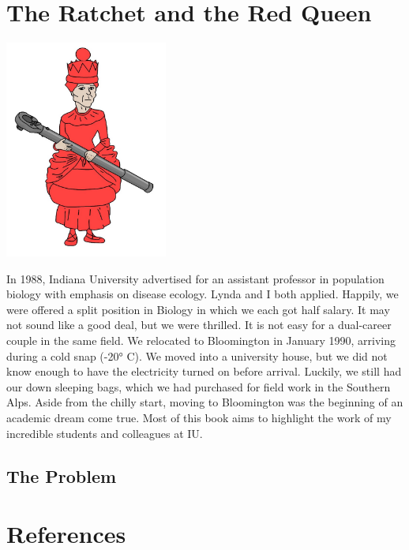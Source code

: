 \documentclass[
  letterpaper,
]{book}
\begin{document}

\chapter{The Ratchet and the Red Queen}\label{sec-chap6}

\begin{center}
\includegraphics[width=0.4\textwidth,height=\textheight]{images/fig6-1.jpeg}
\end{center}

In 1988, Indiana University advertised for an assistant professor in
population biology with emphasis on disease ecology. Lynda and I both
applied. Happily, we were offered a split position in Biology in which
we each got half salary. It may not sound like a good deal, but we were
thrilled. It is not easy for a dual-career couple in the same field. We
relocated to Bloomington in January 1990, arriving during a cold snap
(-20° C). We moved into a university house, but we did not know enough
to have the electricity turned on before arrival. Luckily, we still had
our down sleeping bags, which we had purchased for field work in the
Southern Alps. Aside from the chilly start, moving to Bloomington was
the beginning of an academic dream come true. Most of this book aims to
highlight the work of my incredible students and colleagues at IU.

\section{The Problem}\label{the-problem-1}


\chapter*{References}\label{references}
\end{document}
